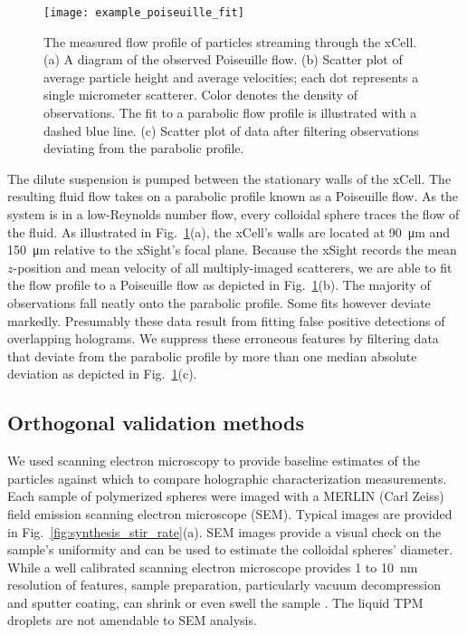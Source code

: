 \begin{figure}
    \centering
    \texttt{[image: example\_poiseuille\_fit]}
    \caption{The measured flow profile of particles streaming through the xCell.
      (a)  A diagram of the observed Poiseuille flow.\protect\footnotemark 
      (b) Scatter plot of average particle height and average velocities; each
      dot represents a single micrometer scatterer. Color denotes the density of
      observations. The fit to a parabolic flow profile is illustrated with a dashed
      blue line. (c) Scatter plot of data after filtering observations deviating
      from the parabolic profile.}
    \label{fig:flow_prof}
\end{figure}

The dilute suspension is pumped between the stationary walls of the xCell.
The resulting fluid flow takes on a parabolic profile known as a Poiseuille flow.
As the system is in a low-Reynolds number flow, every colloidal sphere traces
the flow of the fluid.
As illustrated in Fig.~\ref{fig:flow_prof}(a), the xCell's walls are located
at \SI{90}{\um} and \SI{150}{\um} relative to the xSight's focal plane.
Because the xSight records the mean $z$-position and mean 
velocity of all multiply-imaged scatterers, we are able to fit the flow
profile to a Poiseuille flow as depicted in Fig.~\ref{fig:flow_prof}(b).
The majority of observations fall neatly onto the parabolic profile. 
Some fits however deviate markedly. Presumably these data result from fitting
false positive detections of overlapping holograms.
We suppress these erroneous features by filtering data that deviate from
the parabolic profile by more than one median absolute deviation
as depicted in Fig.~\ref{fig:flow_prof}(c).

\subsection{Orthogonal validation methods}


We used scanning electron microscopy to provide baseline estimates of the
particles against which to compare holographic characterization measurements.
Each sample of polymerized spheres were imaged with a MERLIN (Carl Zeiss) field
emission scanning electron microscope (SEM).
Typical images are provided in Fig.~\ref{fig:synthesis_stir_rate}(a).
SEM images provide a visual check on the sample's uniformity
and can be used to estimate the colloidal spheres' diameter. While a well calibrated scanning
electron microscope provides \num{1} to \SI{10}{\nm} resolution of features, sample
preparation, particularly vacuum decompression and sputter coating, can shrink or
even swell the sample \cite{yamada85,jung02}. The liquid TPM droplets
are not amendable to SEM analysis.

